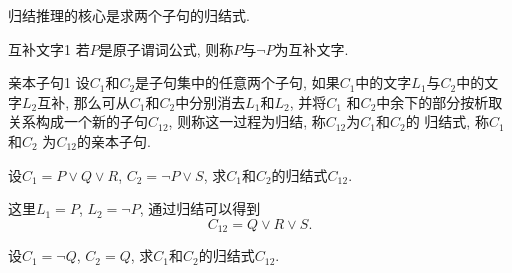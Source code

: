 归结推理的核心是求两个子句的归结式.
\begin{mydef}{互补文字}{1}
   若$P$是原子谓词公式, 则称$P$与$\neg P$为互补文字.
\end{mydef}
\begin{mydef}{亲本子句}{1}
   设$C_1$和$C_2$是子句集中的任意两个子句, 如果$C_1$中的文字$L_1$与$C_2$中的文字$L_2$互补, 那么可从$C_1$和$C_2$中分别消去$L_1$和$L_2$, 并将$C_1$ 和$C_2$中余下的部分按析取关系构成一个新的子句$C_{12}$, 则称这一过程为归结, 称$C_{12}$为$C_1$和$C_2$的
   归结式, 称$C_1$和$C_2$ 为$C_{1 2}$的亲本子句.
\end{mydef}
\begin{example}
  设$C_1 =P\vee Q\vee R$, $C_2=\neg P\vee S$, 求$C_1$和$C_2$的归结式$C_{12}$.
\end{example}
\begin{result}
这里$L_1=P$, $L_2=\neg P$, 通过归结可以得到
             $$C_{12}= Q\vee R\vee S.$$
\begin{example}
  设$C_1=\neg Q$, $C_2=Q$, 求$C_1$和$C_2$的归结式$C_{12}$.
\end{example}
\end{result}
